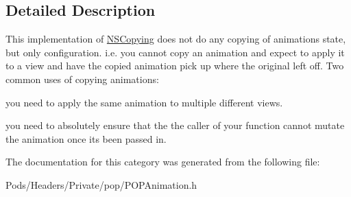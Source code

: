\subsection{Detailed Description}
This implementation of \mbox{\hyperlink{class_n_s_copying-p}{N\+S\+Copying}} does not do any copying of animation\textquotesingle{}s state, but only configuration. i.\+e. you cannot copy an animation and expect to apply it to a view and have the copied animation pick up where the original left off. Two common uses of copying animations\+:
\begin{DoxyItemize}
\item you need to apply the same animation to multiple different views.
\item you need to absolutely ensure that the the caller of your function cannot mutate the animation once it\textquotesingle{}s been passed in. 
\end{DoxyItemize}

The documentation for this category was generated from the following file\+:\begin{DoxyCompactItemize}
\item 
Pods/\+Headers/\+Private/pop/P\+O\+P\+Animation.\+h\end{DoxyCompactItemize}
